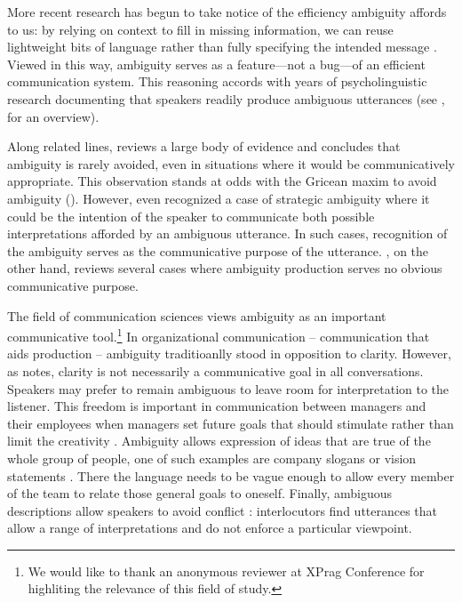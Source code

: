 \documentclass[10pt,a4paper]{article}
\begin{document}
More recent research has begun to take notice of the efficiency ambiguity affords to us: by relying on context to fill in missing information, we can reuse lightweight bits of language rather than fully specifying the intended message \cite{levinson2000,piantadosietal2012,wasow2015}. 
Viewed in this way, ambiguity serves as a feature---not a bug---of an efficient communication system.
This reasoning accords with years of psycholinguistic research documenting that speakers readily produce ambiguous utterances (see , for an overview). 

Along related lines,  reviews a large body of evidence and concludes that ambiguity is rarely avoided, even in situations where it would be communicatively appropriate.
This observation stands at odds with the Gricean maxim to avoid ambiguity ().
However, even \citeauthor{grice1975} recognized a case of strategic ambiguity where it could be the intention of the speaker to communicate both possible interpretations afforded by an ambiguous utterance. In such cases, recognition of the ambiguity serves as the communicative purpose of the utterance. \citeauthor{wasow2015}, on the other hand, reviews several cases where ambiguity production serves no obvious communicative purpose.

The field of communication sciences views ambiguity as an important communicative tool.\footnote{We would like to thank an anonymous reviewer at XPrag Conference for highliting the relevance of this field of study.} In organizational communication -- communication that aids production -- ambiguity traditioanlly stood in opposition to clarity. However, as  notes, clarity is not necessarily a communicative goal in all conversations. Speakers may prefer to remain ambiguous to leave room for interpretation to the listener. This freedom is important in communication between managers and their employees when managers set future goals that should stimulate rather than limit the creativity \cite{mohr1983implications}. Ambiguity allows expression of ideas that are true of the whole group of people, one of such examples are company slogans or vision statements \cite{carmon2013}. There the language needs to be vague enough to allow every member of the team to relate those general goals to oneself. Finally, ambiguous descriptions allow speakers to avoid conflict \cite{pascale1981art}: interlocutors find utterances that allow a range of interpretations and do not enforce a particular viewpoint.
\end{document}
